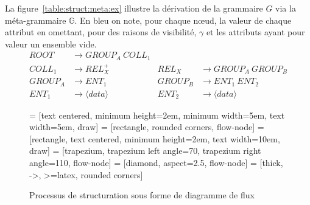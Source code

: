\begin{example}
    \label{ex:struct:meta}
    La figure~\ref{table:struct:meta:ex} illustre la dérivation de la grammaire $G$ via la méta-grammaire $\mathbb{G}$.
    En bleu on note, pour chaque nœud, la valeur de chaque attribut en omettant, pour des raisons de visibilité, $\gamma$ et les attributs ayant pour valeur un ensemble vide.
    \begin{align*}
        ROOT    & \to GROUP_A ~ COLL_1                                          \\
        COLL_1  & \to REL_X^+              & REL_X   & \to GROUP_A ~ GROUP_B    \\
        GROUP_A & \to ENT_1                & GROUP_B & \to ENT_1 ~ ENT_2        \\
        ENT_1   & \to \langle data \rangle & ENT_2   & \to \langle data \rangle
    \end{align*}
\end{example}

\begin{figure}[H]
    \centering
     = [text centered, minimum height=2em, minimum width=5em, text width=5em, draw]
     = [rectangle, rounded corners, flow-node]
     = [rectangle, text centered, minimum height=2em, text width=10em, draw]
     = [trapezium, trapezium left angle=70, trapezium right angle=110, flow-node]
     = [diamond, aspect=2.5, flow-node]
     = [thick, ->, >=latex, rounded corners]

    \begin{adjustbox}{max width=\linewidth,max height=.95\textheight,valign=c}
    \end{adjustbox}

    \caption{Processus de structuration sous forme de diagramme de flux}
    \label{fig:struct:flow}
\end{figure}

